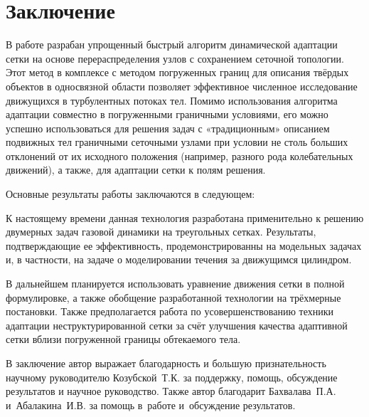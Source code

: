 \chapter*{Заключение}                       %
В работе разрабан упрощенный быстрый алгоритм динамической адаптации сетки на основе перераспределения узлов с сохранением сеточной топологии. Этот метод в комплексе с методом погруженных границ для описания твёрдых объектов в односвязной области позволяет  эффективное численное исследование движущихся в турбулентных потоках тел.  Помимо использования алгоритма адаптации совместно в погруженными граничными условиями, его можно успешно использоваться для решения задач с «традиционным» описанием подвижных тел граничными сеточными узлами при условии не столь
больших отклонений от их исходного положения (например, разного рода 
колебательных движений), а также, для адаптации сетки к полям решения.

Основные результаты работы заключаются в следующем:


К настоящему времени данная технология разработана применительно к решению двумерных задач газовой динамики на треугольных сетках. Результаты, подтверждающие ее эффективность, продемонстрированны на модельных задачах и, в частности, на задаче о моделировании течения за движущимся цилиндром.

В дальнейшем планируется использовать уравнение движения сетки в полной формулировке, а также обобщение разработанной технологии на трёхмерные постановки. Также предполагается работа по усовершенствованию техники адаптации неструктурированной сетки за счёт улучшения качества адаптивной сетки вблизи погруженной границы обтекаемого тела. 



В заключение автор
выражает благодарность и большую признательность научному руководителю
Козубской~Т.\:К. за поддержку, помощь, обсуждение результатов и научное
руководство. Также автор благодарит Бахвалава~П.\:А. и~Абалакина~И.\:В.
за помощь в~работе и~обсуждение результатов.
